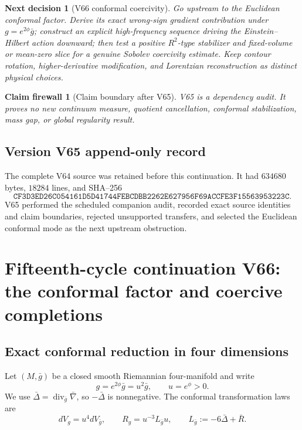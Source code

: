 \documentclass[11pt]{article}
\newtheorem{firewall}[theorem]{Claim firewall}
\newtheorem{decision}[theorem]{Next decision}
\theoremstyle{remark}
\begin{document}
\begin{decision}[V66 conformal coercivity]
\label{dec:v15v65-next}
Go upstream to the Euclidean conformal factor.  Derive its exact
wrong-sign gradient contribution under \(g=e^{2\phi}\bar g\);
construct an explicit high-frequency sequence driving the
Einstein--Hilbert action downward; then test a positive
\(R^2\)-type stabilizer and fixed-volume or mean-zero slice for a
genuine Sobolev coercivity estimate.  Keep contour rotation,
higher-derivative modification, and Lorentzian reconstruction as
distinct physical choices.
\end{decision}

\begin{firewall}[Claim boundary after V65]
\label{fire:v15v65}
V65 is a dependency audit.  It proves no new continuum measure,
quotient cancellation, conformal stabilization, mass gap, or
global regularity result.
\end{firewall}

\section*{Version V65 append-only record}
The complete V64 source was retained before this continuation.  It
had \(634680\) bytes, \(18284\) lines, and SHA--256
\[
 \texttt{CF3D3ED26C054161D5D41744FEBCDBB2262E627956F69ACCFE3F15563953223C}.
\]
V65 performed the scheduled companion audit, recorded exact source
identities and claim boundaries, rejected unsupported transfers,
and selected the Euclidean conformal mode as the next upstream
obstruction.

\chapter{Fifteenth-cycle continuation V66: the conformal factor and coercive completions}
\label{sec:v15v66}

\section{Exact conformal reduction in four dimensions}

Let \((M,\bar g)\) be a closed smooth Riemannian four-manifold and
write
\[
 g=e^{2\phi}\bar g=u^2\bar g,\qquad u=e^\phi>0.         \tag{66.1}
\]
We use \(\bar\Delta=\operatorname{div}_{\bar g}\bar\nabla\), so
\(-\bar\Delta\) is nonnegative.  The conformal transformation laws
are
\[
 dV_g=u^4dV_{\bar g},\qquad
 R_g=u^{-3}L_{\bar g}u,\qquad
 L_{\bar g}:=-6\bar\Delta+\bar R.                      \tag{66.2}
\]
\end{document}
